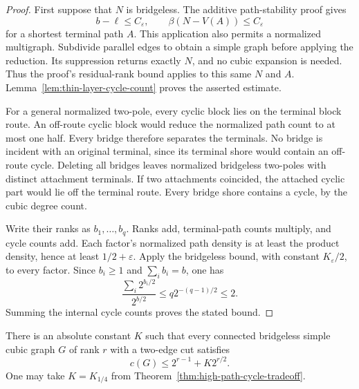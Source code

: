 \begin{proof}
First suppose that $N$ is bridgeless.
The additive path-stability proof gives
\[
 b-\ell\le C_\varepsilon,
 \qquad \beta(N-V(A))\le C_\varepsilon
\]
for a shortest terminal path $A$.
This application also permits a normalized multigraph.
Subdivide parallel edges to obtain a simple graph before applying the reduction.
Its suppression returns exactly $N$, and no cubic expansion is needed.
Thus the proof's residual-rank bound applies to this same $N$ and $A$.
Lemma~\ref{lem:thin-layer-cycle-count} proves the asserted estimate.

For a general normalized two-pole, every cyclic block lies on the terminal block route.
An off-route cyclic block would reduce the normalized path count to at most one half.
Every bridge therefore separates the terminals.
No bridge is incident with an original terminal, since its terminal shore would contain an off-route cycle.
Deleting all bridges leaves normalized bridgeless two-poles with distinct attachment terminals.
If two attachments coincided, the attached cyclic part would lie off the terminal route.
Every bridge shore contains a cycle, by the cubic degree count.

Write their ranks as $b_1,\ldots,b_q$.
Ranks add, terminal-path counts multiply, and cycle counts add.
Each factor's normalized path density is at least the product density, hence at least $1/2+\varepsilon$.
Apply the bridgeless bound, with constant $K_\varepsilon/2$, to every factor.
Since $b_i\ge1$ and $\sum_i b_i=b$, one has
\[
 \frac{\sum_i2^{b_i/2}}{2^{b/2}}
 \le q2^{-(q-1)/2}\le2.
\]
Summing the internal cycle counts proves the stated bound.
\end{proof}

\begin{corollary}
\label{cor:simple-cubic-two-cut-error}
There is an absolute constant $K$ such that every connected bridgeless simple cubic graph $G$ of rank $r$ with a two-edge cut satisfies
\[
 c(G)\le2^{r-1}+K2^{r/2}.
\]
One may take $K=K_{1/4}$ from Theorem~\ref{thm:high-path-cycle-tradeoff}.
\end{corollary}

